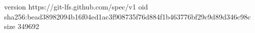 version https://git-lfs.github.com/spec/v1
oid sha256:bead38982094b16f04ed1ac3f908735f76d884f1b463776bf29c9d89d346c98c
size 349692
